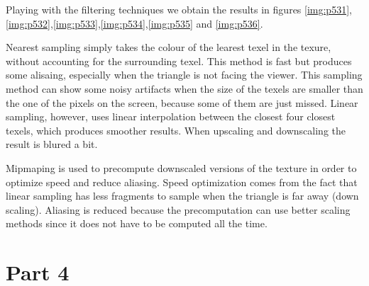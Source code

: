 Playing with the filtering techniques we obtain the results in figures
\ref{img:p531},\ref{img:p532},\ref{img:p533},\ref{img:p534},\ref{img:p535} and \ref{img:p536}. 


Nearest sampling simply takes the colour of the learest texel in the texure, without accounting
for the surrounding texel. This method is fast but produces some alisaing, especially
when the triangle is not facing the viewer. This sampling method can show some noisy
artifacts when the size of the texels are smaller than the one of the pixels on the
screen, because some of them are just missed.
Linear sampling, however, uses linear interpolation between the closest four closest
texels, which produces smoother results. When upscaling and downscaling the result is
blured a bit.

Mipmaping is used to precompute downscaled versions of the texture in order to
optimize speed and reduce aliasing.
Speed optimization comes from the fact that linear sampling has less fragments to
sample when the triangle is far away (down scaling). Aliasing is reduced because
the precomputation can use better scaling methods since it does not have to be
computed all the time. 

\section{Part 4}


